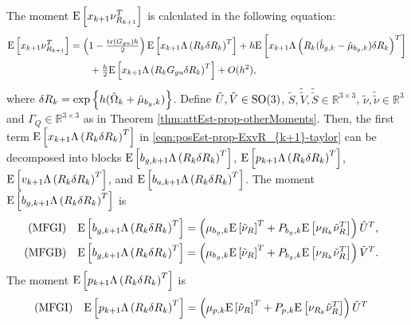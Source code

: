 \begin{theorem} \label{thm:posEst-prop-ExvR}
	The moment $\mathrm{E}\left[ x_{k+1}\nu_{R_{k+1}}^T \right]$ is calculated in the following equation:
	\begin{align} \label{eqn:posEst-prop-ExvR_{k+1}-taylor}
		\expect{x_{k+1}\nu_{R_{k+1}}^T} &= \left( 1 - \tfrac{\tr{G_{gu}}h}{2} \right) \expect{x_{k+1}\Lambda\left(R_k\delta R_k\right)^T} + h\expect{x_{k+1}\Lambda\left( R_k (\hat{b}_{g,k}-\hat{\mu}_{b_g,k}) \delta R_k \right)^T} \nonumber \\
		&\qquad + \tfrac{h}{2} \expect{x_{k+1}\Lambda\left( R_kG_{gu}\delta R_k \right)^T} + O(h^2),
	\end{align}
	where $\delta R_k = \exp\left\{ h(\hat{\Omega}_k + \hat{\mu}_{b_g,k}) \right\}$.
	Define $\tilde{U}, \tilde{V}\in\mathrm{SO}(3)$, $\tilde{S}, \tilde{\tilde{V}}, \tilde{\tilde{S}}\in\mathbb{R}^{3\times 3}$, $\tilde{\nu}, \tilde{\tilde{\nu}}\in\mathbb{R}^3$ and $\Gamma_Q\in\mathbb{R}^{3\times 3}$ as in Theorem \ref{thm:attEst-prop-otherMoments}.
	Then, the first term $\mathrm{E}\left[ x_{k+1}\Lambda\left(R_k\delta R_k\right)^T \right]$ in \eqref{eqn:posEst-prop-ExvR_{k+1}-taylor} can be decomposed into blocks $\mathrm{E}\left[ b_{g,k+1}\Lambda\left(R_k\delta R_k\right)^T \right]$, $\mathrm{E}\left[ p_{k+1}\Lambda\left(R_k\delta R_k\right)^T \right]$, $\mathrm{E}\left[ v_{k+1}\Lambda\left(R_k\delta R_k\right)^T \right]$, and $\mathrm{E}\left[ b_{a,k+1}\Lambda\left(R_k\delta R_k\right)^T \right]$.
	The moment $\mathrm{E}\left[ b_{g,k+1}\Lambda\left(R_k\delta R_k\right)^T \right]$ is
	\begin{subequations} \label{eqn:posEst-prop-EbgLambda}
		\allowdisplaybreaks
		\begin{flalign}
			\text{(MFGI)} && \expect{b_{g,k+1}\Lambda\left(R_k\delta R_k\right)^T} &= \left( \mu_{b_g,k}\expect{\tilde{\nu}_R}^T + P_{b_g,k}\expect{\nu_{R_k}\tilde{\nu}_R^T} \right) \tilde{U}^T, && \\
			\text{(MFGB)} && \expect{b_{g,k+1}\Lambda\left(R_k\delta R_k\right)^T} &= \left( \mu_{b_g,k}\expect{\tilde{\nu}_R}^T + P_{b_g,k}\expect{\nu_{R_k}\tilde{\nu}_R^T} \right) \tilde{V}^T. &&
		\end{flalign}
	\end{subequations}
	The moment $\mathrm{E}\left[ p_{k+1}\Lambda\left(R_k\delta R_k\right)^T \right]$ is
	\begin{subequations} \label{eqn:posEst-prop-EpLambda}
		\allowdisplaybreaks
		\begin{flalign}
			\text{(MFGI)} && \expect{p_{k+1}\Lambda\left(R_k\delta R_k\right)^T} &= \left( \mu_{p,k}\expect{\tilde{\nu}_R}^T + P_{p,k}\expect{\nu_{R_k}\tilde{\nu}_R^T} \right) \tilde{U}^T && \nonumber \\

\end{flalign}
\end{subequations}
\end{theorem}
